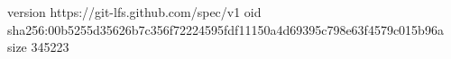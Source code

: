 version https://git-lfs.github.com/spec/v1
oid sha256:00b5255d35626b7c356f72224595fdf11150a4d69395c798e63f4579c015b96a
size 345223
